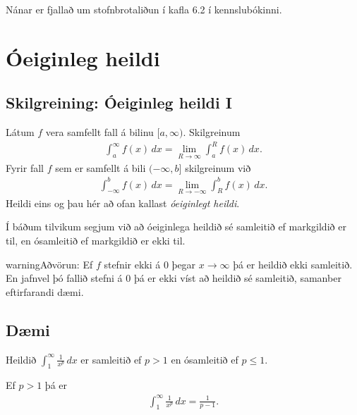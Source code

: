 \documentclass[b5paper,11pt,icelandic]{sphinxmanual}
\begin{document}
Nánar er fjallað um stofnbrotaliðun í kafla 6.2 í kennslubókinni.


\section{Óeiginleg heildi}
\label{kafli06:index-14}\label{kafli06:oeiginleg-heildi}

\subsection{Skilgreining: Óeiginleg heildi I}
\label{kafli06:skilgreining-oeiginleg-heildi-i}
Látum \(f\) vera samfellt fall á bilinu \([a, \infty)\).
Skilgreinum
\begin{equation*}
\begin{split}\int_a^\infty f(x)\,dx=\lim_{R\rightarrow\infty} \int_a^R f(x)\,dx.\end{split}
\end{equation*}
Fyrir fall \(f\) sem er samfellt á bili \((-\infty, b]\)
skilgreinum við
\begin{equation*}
\begin{split}\int_{-\infty}^b f(x)\,dx=\lim_{R\rightarrow-\infty} \int_R^b f(x)\,dx.\end{split}
\end{equation*}
Heildi eins og þau hér að ofan kallast \textit{óeiginlegt heildi}.

Í báðum tilvikum segjum við að óeiginlega heildið sé samleitið ef
markgildið er til, en ósamleitið ef markgildið er ekki til.

\begin{notice}{warning}{Aðvörun:}
Ef \(f\) stefnir ekki á 0 þegar \(x\to \infty\) þá
er heildið ekki samleitið. En jafnvel þó fallið stefni á
0 þá er ekki víst að heildið sé samleitið, samanber
eftirfarandi dæmi.
\end{notice}


\subsection{Dæmi}
\label{kafli06:daemi}
Heildið \(\int_1^\infty \frac{1}{x^p}\,dx\) er samleitið ef
\(p>1\) en ósamleitið ef \(p\leq 1\).

Ef \(p>1\) þá er
\begin{equation*}
\begin{split}\int_1^\infty \frac{1}{x^p}\,dx=\frac{1}{p-1}.\end{split}
\end{equation*}
\end{document}
